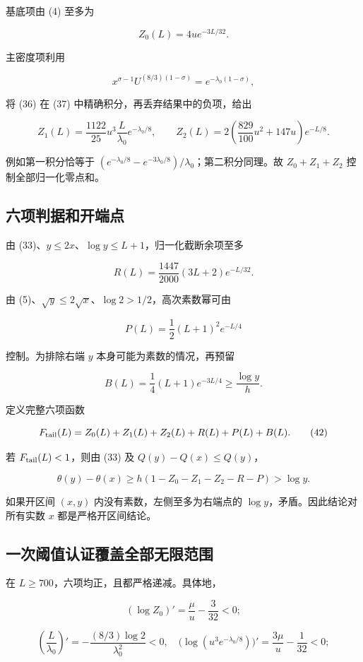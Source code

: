 \documentclass[UTF8,zihao=-4,fontset=fandol]{ctexart}
\begin{document}
基底项由 (4) 至多为

\[
Z_0(L)=4u e^{-3L/32}.
\]

主密度项利用

\[
x^{\sigma-1}U^{(8/3)(1-\sigma)}
=e^{-\lambda_0(1-\sigma)},
\]

将 (36) 在 (37) 中精确积分，再丢弃结果中的负项，给出

\[
Z_1(L)=\frac{1122}{25}u^3\frac L{\lambda_0}e^{-\lambda_0/8},\qquad
Z_2(L)=2\left(\frac{829}{100}u^2+147u\right)e^{-L/8}. \tag{38}
\]

例如第一积分恰等于 \((e^{-\lambda_0/8}-e^{-3\lambda_0/8})/\lambda_0\)；第二积分同理。故 \(Z_0+Z_1+Z_2\) 控制全部归一化零点和。

\subsection{六项判据和开端点}

由 (33)、\(y\le2x\)、\(\log y\le L+1\)，归一化截断余项至多

\[
R(L)=\frac{1447}{2000}(3L+2)e^{-L/32}. \tag{39}
\]

由 (5)、\(\sqrt y\le2\sqrt x\)、\(\log2>1/2\)，高次素数幂可由

\[
P(L)=\frac12(L+1)^2e^{-L/4} \tag{40}
\]

控制。为排除右端 \(y\) 本身可能为素数的情况，再预留

\[
B(L)=\frac14(L+1)e^{-3L/4}\ge\frac{\log y}{h}. \tag{41}
\]

定义完整六项函数

\[
F_{\rm tail}(L)=Z_0(L)+Z_1(L)+Z_2(L)+R(L)+P(L)+B(L). \tag{42}
\]

若 \(F_{\rm tail}(L)<1\)，则由 (33) 及 \(Q(y)-Q(x)\le Q(y)\)，

\[
\theta(y)-\theta(x)\ge h(1-Z_0-Z_1-Z_2-R-P)>\log y.
\]

如果开区间 \((x,y)\) 内没有素数，左侧至多为右端点的 \(\log y\)，矛盾。因此结论对所有实数 \(x\) 都是严格开区间结论。

\subsection{一次阈值认证覆盖全部无限范围}

在 \(L\ge700\)，六项均正，且都严格递减。具体地，

\[
(\log Z_0)'=\frac\mu u-\frac3{32}<0;
\]

\[
\left(\frac L{\lambda_0}\right)'
=-\frac{(8/3)\log2}{\lambda_0^2}<0,
\quad
\bigl(\log(u^3e^{-\lambda_0/8})\bigr)'
=\frac{3\mu}{u}-\frac1{32}<0;
\]
\end{document}
